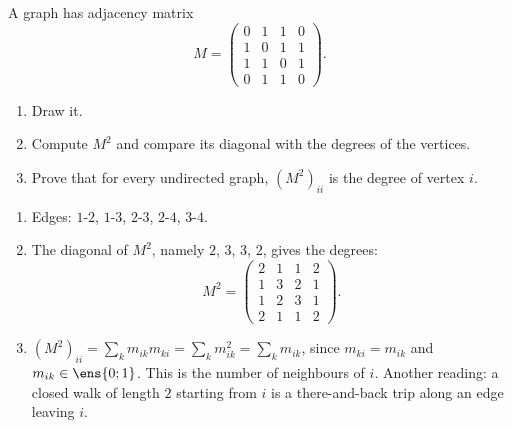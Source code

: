 \begin{exercise}
A graph has adjacency matrix \[M=\begin{pmatrix}0&1&1&0\\1&0&1&1\\1&1&0&1\\0&1&1&0\end{pmatrix}.\]
\begin{enumerate}
\item Draw it.
\item Compute $M^2$ and compare its diagonal with the degrees of the vertices.
\item Prove that for every undirected graph, $\left(M^2\right)_{ii}$ is the degree of vertex $i$.
\end{enumerate}
\end{exercise}
\begin{solution}
\begin{enumerate}
\item Edges: $1$-$2$, $1$-$3$, $2$-$3$, $2$-$4$, $3$-$4$.
\item The diagonal of $M^2$, namely $2$, $3$, $3$, $2$, gives the degrees: \[M^2=\begin{pmatrix}2&1&1&2\\1&3&2&1\\1&2&3&1\\2&1&1&2\end{pmatrix}.\]
\item $\left(M^2\right)_{ii}=\sum_km_{ik}m_{ki}=\sum_km_{ik}^2=\sum_km_{ik}$, since $m_{ki}=m_{ik}$ and $m_{ik}\in\ens{0;1}$. This is the number of neighbours of $i$. Another reading: a closed walk of length $2$ starting from $i$ is a there-and-back trip along an edge leaving $i$.
\end{enumerate}
\end{solution}

